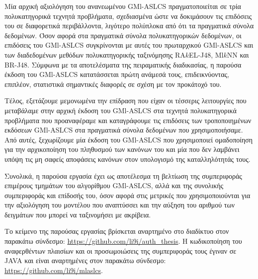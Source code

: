Μία αρχική αξιολόγηση του ανανεωμένου GMl-ASLCS πραγματοποιείται σε τρία πολυκατηγορικά τεχνητά προβλήματα, σχεδιασμένα ώστε να δοκιμάσουν τις επιδόσεις του σε διαφορετικά περιβάλλοντα, λιγότερο πολύπλοκα από ότι τα πραγματικά σύνολα δεδομένων. Όσον αφορά στα πραγματικά σύνολα πολυκατηγορικών δεδομένων, οι επιδόσεις του GMl-ASLCS συγκρίνονται με αυτές του πρωταρχικού GMl-ASLCS και των διαδεδομένων μεθόδων πολυκατηγορικής ταξινόμησης RA$k$EL-J48, Ml$k$NN και BR-J48. Σύμφωνα με τα αποτελέσματα της πειραματικής διαδικασίας, η παρούσα έκδοση του GMl-ASLCS κατατάσσεται πρώτη ανάμεσά τους, επιδεικνύοντας, επιπλέον, στατιστικά σημαντικές διαφορές σε σχέση με τον προκάτοχό του.

Τέλος, εξετάζουμε μεμονωμένα την επίδραση που είχαν οι τέσσερις λειτουργίες που μεταβάλαμε στην αρχική έκδοση του GMl-ASLCS στα τεχνητά πολυκατηγορικά προβλήματα που προαναφέραμε και καταγράφουμε τις επιδόσεις των τροποποιημένων εκδόσεων GMl-ASLCS στα πραγματικά σύνολα δεδομένων που χρησιμοποιήσαμε. Από αυτές, ξεχωρίζουμε μία έκδοση του GMl-ASLCS που χρησιμοποιεί ομαδοποίηση για την αρχικοποίηση του πληθυσμού των κανόνων του και μία που δεν λαμβάνει υπόψη τις μη σαφείς αποφάσεις κανόνων στον υπολογισμό της καταλληλότητάς τους.

Συνολικά, η παρούσα εργασία έχει ως αποτέλεσμα τη βελτίωση της συμπεριφοράς επιμέρους τμημάτων του αλγορίθμου GMl-ASLCS, αλλά και της συνολικής συμπεριφοράς και επίδοσής του, όσον αφορά στις μετρικές που χρησιμοποιούνται για την αξιολόγηση του μοντέλου που αναπτύσσει και την αύξηση του αριθμού των δειγμάτων που μπορεί να ταξινομήσει με ακρίβεια.

Το κείμενο της παρούσας εργασίας βρίσκεται αναρτημένο στο διαδίκτυο στον παρακάτω
σύνδεσμο: \url{https://github.com/li9i/auth_thesis}. Η κωδικοποίηση του
αναφερθέντων πλαισίων και οι προσωμοιώσεις της συμπεριφοράς τους έγιναν σε JAVA
και είναι αναρτημένες στον παρακάτω σύνδεσμο: \url{https://github.com/li9i/mlaslcs}.
